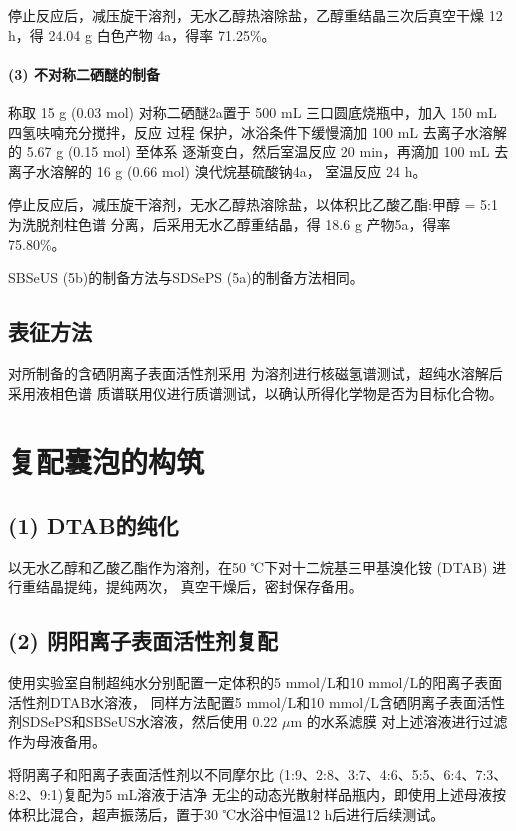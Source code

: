 \documentclass[bachelor,winfonts,replaceperiod]{jnuthesis}
\begin{document}
    停止反应后，减压旋干溶剂，无水乙醇热溶除盐，乙醇重结晶三次后真空干燥 12 h，得 24.04 g 白色产物
    4a，得率 71.25\%。
    
    \paragraph*{(3) 不对称二硒醚的制备}
    称取 15 g (0.03 mol) 对称二硒醚2a置于 500 mL 三口圆底烧瓶中，加入 150 mL 四氢呋喃充分搅拌，反应
    过程  保护，冰浴条件下缓慢滴加 100 mL 去离子水溶解的 5.67 g (0.15 mol) 至体系
    逐渐变白，然后室温反应 20 min，再滴加 100 mL 去离子水溶解的 16 g (0.66 mol) 溴代烷基硫酸钠4a，
    室温反应 24 h。
    
    停止反应后，减压旋干溶剂，无水乙醇热溶除盐，以体积比乙酸乙酯:甲醇 = 5:1 为洗脱剂柱色谱
    分离，后采用无水乙醇重结晶，得 18.6 g 产物5a，得率 75.80\%。
    
    SBSeUS (5b)的制备方法与SDSePS (5a)的制备方法相同。
    
    \subsection{表征方法}
    对所制备的含硒阴离子表面活性剂采用 为溶剂进行核磁氢谱测试，超纯水溶解后采用液相色谱
    质谱联用仪进行质谱测试，以确认所得化学物是否为目标化合物。
    
    \section{复配囊泡的构筑}
    \subsection*{(1) DTAB的纯化}
    以无水乙醇和乙酸乙酯作为溶剂，在50 ℃下对十二烷基三甲基溴化铵 (DTAB) 进行重结晶提纯，提纯两次，
    真空干燥后，密封保存备用。
    
    \subsection*{(2) 阴阳离子表面活性剂复配}
    使用实验室自制超纯水分别配置一定体积的5 mmol/L和10 mmol/L的阳离子表面活性剂DTAB水溶液，
    同样方法配置5 mmol/L和10 mmol/L含硒阴离子表面活性剂SDSePS和SBSeUS水溶液，然后使用 0.22 $\mu$m 的水系滤膜
    对上述溶液进行过滤作为母液备用。
    
    将阴离子和阳离子表面活性剂以不同摩尔比 (1:9、2:8、3:7、4:6、5:5、6:4、7:3、8:2、9:1)复配为5 mL溶液于洁净
    无尘的动态光散射样品瓶内，即使用上述母液按体积比混合，超声振荡后，置于30 ℃水浴中恒温12 h后进行后续测试。
        
\end{document}
